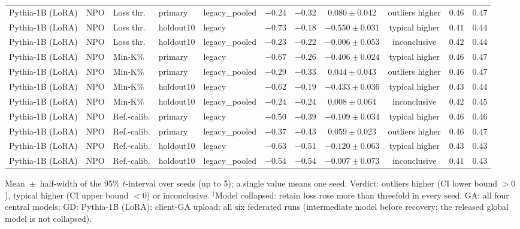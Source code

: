 \begin{table}[t]
\begin{tabular*}{\textwidth}{@{\extracolsep{\fill}}lllllcccccc@{}}
Pythia-1B (LoRA) & NPO & Loss thr. & primary & legacy\_pooled & $-0.24$ & $-0.32$ & $0.080 \pm 0.042$ & outliers higher & $0.46$ & $0.47$ \\
Pythia-1B (LoRA) & NPO & Loss thr. & holdout10 & legacy & $-0.73$ & $-0.18$ & $-0.550 \pm 0.031$ & typical higher & $0.41$ & $0.44$ \\
Pythia-1B (LoRA) & NPO & Loss thr. & holdout10 & legacy\_pooled & $-0.23$ & $-0.22$ & $-0.006 \pm 0.053$ & inconclusive & $0.42$ & $0.44$ \\
Pythia-1B (LoRA) & NPO & Min-K\% & primary & legacy & $-0.67$ & $-0.26$ & $-0.406 \pm 0.024$ & typical higher & $0.46$ & $0.47$ \\
Pythia-1B (LoRA) & NPO & Min-K\% & primary & legacy\_pooled & $-0.29$ & $-0.33$ & $0.044 \pm 0.043$ & outliers higher & $0.46$ & $0.47$ \\
Pythia-1B (LoRA) & NPO & Min-K\% & holdout10 & legacy & $-0.62$ & $-0.19$ & $-0.433 \pm 0.036$ & typical higher & $0.43$ & $0.44$ \\
Pythia-1B (LoRA) & NPO & Min-K\% & holdout10 & legacy\_pooled & $-0.24$ & $-0.24$ & $0.008 \pm 0.064$ & inconclusive & $0.42$ & $0.45$ \\
Pythia-1B (LoRA) & NPO & Ref.-calib. & primary & legacy & $-0.50$ & $-0.39$ & $-0.109 \pm 0.034$ & typical higher & $0.46$ & $0.46$ \\
Pythia-1B (LoRA) & NPO & Ref.-calib. & primary & legacy\_pooled & $-0.37$ & $-0.43$ & $0.059 \pm 0.023$ & outliers higher & $0.46$ & $0.47$ \\
Pythia-1B (LoRA) & NPO & Ref.-calib. & holdout10 & legacy & $-0.63$ & $-0.51$ & $-0.120 \pm 0.063$ & typical higher & $0.43$ & $0.43$ \\
Pythia-1B (LoRA) & NPO & Ref.-calib. & holdout10 & legacy\_pooled & $-0.54$ & $-0.54$ & $-0.007 \pm 0.073$ & inconclusive & $0.41$ & $0.43$ \\
\bottomrule
\end{tabular*}

\smallskip
{\footnotesize Mean~$\pm$~half-width of the 95\% $t$-interval over seeds (up to 5); a single value means one seed. Verdict: outliers higher (CI lower bound $>0$), typical higher (CI upper bound $<0$) or inconclusive. $^{\dagger}$Model collapsed: retain loss rose more than threefold in every seed. GA: all four central models; GD: Pythia-1B (LoRA); client-GA upload: all six federated runs (intermediate model before recovery; the released global model is not collapsed).\par}
\end{table}
